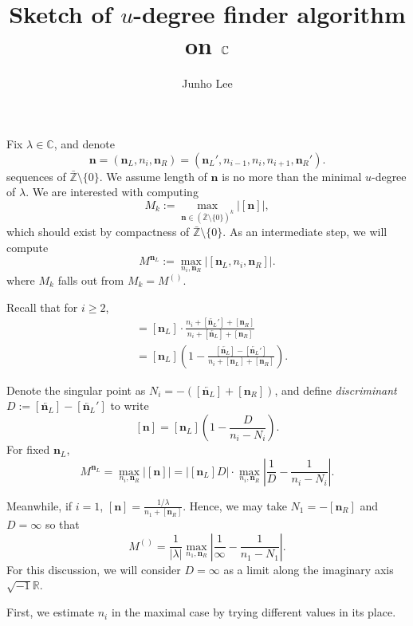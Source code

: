 \documentclass{article}
\title{Sketch of $u$-degree finder algorithm on $\bC$}
\author{Junho Lee}
\theoremstyle{definition}
\theoremstyle{plain}
\theoremstyle{remark}
\numberwithin{equation}{section}
\newcommand{\bZ}{\mathbb{Z}}
\newcommand{\bR}{\mathbb{R}}
\newcommand{\bC}{\mathbb{C}}
\newcommand{\abs}[1]{\left| {#1} \right|}
\newcommand{\im}{{\sqrt{-1}}}
\def\ns{{\mathbf{n}}}
\def\nsL{{\mathbf{n}_L}}
\def\nsR{{\mathbf{n}_R}}
\begin{document}
\maketitle

Fix $\lambda \in \bC$, and denote
\[
  \ns = (\nsL, n_i, \nsR) = (\nsL', n_{i-1}, n_i, n_{i+1}, \nsR').
\]
sequences of $\bar{\bZ} \setminus \{0\}$.
We assume length of $\ns$ is no more than the minimal $u$-degree of $\lambda$.
We are interested with computing
\[
  M_k := \max_{\ns \in (\bar{\bZ} \setminus \{0\})^k} \abs{[\ns]},
\]
which should exist by compactness of $\bar{\bZ} \setminus \{0\}$.
As an intermediate step, we will compute
\[ M^{\nsL} := \max_{n_i, \nsR} \abs{[\nsL, n_i, \nsR]}. \]
where $M_k$ falls out from $M_k = M^{()}$.

Recall that for $i \geq 2$,
\begin{align*}
  [\ns] & = [\nsL] \cdot \frac{n_i + [\overleftarrow{\nsL}'] + [\nsR]}{n_i + [\overleftarrow{\nsL}] + [\nsR]} \\
  & = [\nsL] \left( 1 - \frac{[\overleftarrow{\nsL}] - [\overleftarrow{\nsL}']}{n_i + [\nsL] + [\nsR]} \right).
\end{align*}

Denote the singular point as $N_i = - ([\overleftarrow{\nsL}] + [\nsR])$,
and define \textit{discriminant} $D := [\overleftarrow{\nsL}] - [\overleftarrow{\nsL}']$ to write
\[
  [\ns] = [\nsL] \left( 1 - \frac{D}{n_i - N_i} \right).
\]
For fixed $\nsL$,
\[
  M^{\nsL} = \max_{n_i, \nsR} \abs{[\ns]} = \abs{[\nsL] D} \cdot \max_{n_i, \nsR} \left| \frac{1}{D} - \frac{1}{n_i - N_i} \right|.
\]

Meanwhile, if $i = 1$, $[\ns] = \frac{1 / \lambda}{n_1 + [\nsR]}$.
Hence, we may take $N_1 = - [\nsR]$ and $D = \infty$ so that
\[
  M^{()} = \frac{1}{\abs{\lambda}} \max_{n_1, \nsR} \abs{\frac{1}{\infty} - \frac{1}{n_1 - N_1}}.
\]
For this discussion, we will consider $D = \infty$ as a limit along the imaginary axis $\im \bR$.

First, we estimate $n_i$ in the maximal case by trying different values in its place.
\end{document}
